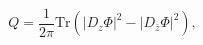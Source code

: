 \begin{equation}
Q=\frac{1}{2\pi}\mathrm{Tr}\left( \left\vert D_{z}\Phi\right\vert
^{2}-\left\vert D_{\bar{z}}\Phi\right\vert ^{2}\right) , \label{Q1}%
\end{equation}

